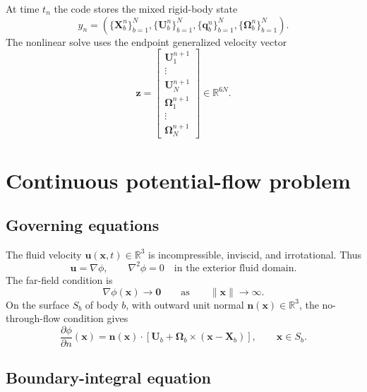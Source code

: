\documentclass[11pt,a4paper]{article}
\newcommand{\R}{\mathbb{R}}
\newcommand{\bn}{\bm{n}}
\newcommand{\bx}{\bm{x}}
\newcommand{\bX}{\bm{X}}
\newcommand{\bU}{\bm{U}}
\newcommand{\bOmega}{\bm{\Omega}}
\newcommand{\bz}{\bm{z}}
\newcommand{\bzero}{\bm{0}}
\newcommand{\quat}[1]{\mathbf{#1}}
\begin{document}
At time $t_n$ the code stores the mixed rigid-body state
\begin{equation}
  y_n =
  \left(
    \{\bX_b^n\}_{b=1}^N,
    \{\bU_b^n\}_{b=1}^N,
    \{\quat{q}_b^n\}_{b=1}^N,
    \{\bOmega_b^n\}_{b=1}^N
  \right).
\end{equation}
The nonlinear solve uses the endpoint generalized velocity vector
\begin{equation}
  \bz =
  \begin{bmatrix}
    \bU_1^{n+1}\\
    \vdots\\
    \bU_N^{n+1}\\
    \bOmega_1^{n+1}\\
    \vdots\\
    \bOmega_N^{n+1}
  \end{bmatrix}
  \in\R^{6N}.
  \label{eq:z-endpoint}
\end{equation}

\section{Continuous potential-flow problem}

\subsection{Governing equations}

The fluid velocity $\bm{u}(\bx,t)\in\R^3$ is incompressible, inviscid, and
irrotational.  Thus
\begin{equation}
  \bm{u}=\nabla\phi,\qquad
  \nabla^2\phi=0
  \quad\text{in the exterior fluid domain}.
  \label{eq:laplace}
\end{equation}
The far-field condition is
\begin{equation}
  \nabla\phi(\bx)\to\bzero
  \qquad\text{as}\qquad \|\bx\|\to\infty .
  \label{eq:far-field}
\end{equation}
On the surface $S_b$ of body $b$, with outward unit normal $\bn(\bx)\in\R^3$,
the no-through-flow condition gives
\begin{equation}
  \frac{\partial\phi}{\partial n}(\bx)
  =
  \bn(\bx)\cdot
  \left[
    \bU_b+\bOmega_b\times(\bx-\bX_b)
  \right],
  \qquad \bx\in S_b .
  \label{eq:continuous-neumann}
\end{equation}

\subsection{Boundary-integral equation}
\end{document}

